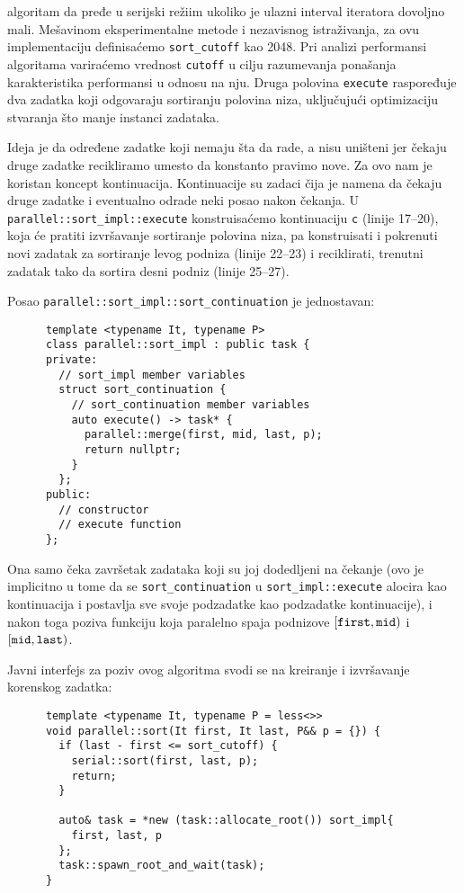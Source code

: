 \documentclass[a4paper,11pt]{article}
\begin{document}
    algoritam da pređe u serijski režiim ukoliko je ulazni interval iteratora dovoljno mali. Mešavinom
    eksperimentalne metode i nezavisnog istraživanja, za ovu implementaciju definisaćemo \verb|sort_cutoff|
    kao 2048. Pri analizi performansi algoritama variraćemo vrednost \verb|cutoff| u cilju razumevanja
    ponašanja karakteristika performansi u odnosu na nju. Druga polovina \verb|execute| raspoređuje dva
    zadatka koji odgovaraju sortiranju polovina niza, uključujući optimizaciju stvaranja što manje instanci
    zadataka.\par
    Ideja je da određene zadatke koji nemaju šta da rade, a nisu uništeni jer čekaju druge zadatke
    recikliramo umesto da konstanto pravimo nove. Za ovo nam je koristan koncept kontinuacija.
    Kontinuacije su zadaci čija je namena da čekaju druge zadatke i eventualno odrade neki posao nakon čekanja.
    U \verb|parallel::sort_impl::execute| konstruisaćemo kontinuaciju \verb|c| (linije 17--20), koja će pratiti izvršavanje
    sortiranje polovina niza, pa konstruisati i pokrenuti novi zadatak za sortiranje levog podniza (linije 22--23) i reciklirati,
    trenutni zadatak tako da sortira desni podniz (linije 25--27).\par
    Posao \verb|parallel::sort_impl::sort_continuation| je jednostavan:
    \begin{verbatim}
      template <typename It, typename P>
      class parallel::sort_impl : public task {
      private:
        // sort_impl member variables
        struct sort_continuation {
          // sort_continuation member variables
          auto execute() -> task* {
            parallel::merge(first, mid, last, p);
            return nullptr;
          }
        };
      public:
        // constructor
        // execute function
      };
    \end{verbatim}
    Ona samo čeka završetak zadataka koji su joj dodedljeni na čekanje (ovo je implicitno u tome da se
    \verb|sort_continuation| u \verb|sort_impl::execute| alocira kao kontinuacija i postavlja sve svoje podzadatke kao podzadatke kontinuacije), i nakon toga
    poziva funkciju koja paralelno spaja podnizove $[\verb|first|, \verb|mid|)$ i $[\verb|mid|, \verb|last|)$.\par
    Javni interfejs za poziv ovog algoritma svodi se na kreiranje i izvršavanje korenskog zadatka:
    \begin{verbatim}
      template <typename It, typename P = less<>>
      void parallel::sort(It first, It last, P&& p = {}) {
        if (last - first <= sort_cutoff) {
          serial::sort(first, last, p);
          return;
        }
        
        auto& task = *new (task::allocate_root()) sort_impl{
          first, last, p
        };
        task::spawn_root_and_wait(task);
      }
    \end{verbatim}
\end{document}
